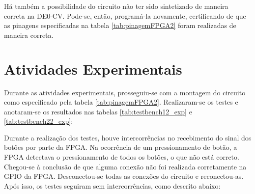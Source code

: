 \documentclass[amsmath,amssymb,floatfix]{report}
\begin{document}
Há também a possibilidade do circuito não ter sido sintetizado de maneira correta na DE0-CV. Pode-se, então, programá-la novamente, certificando de que as pinagens especificadas na tabela \ref{tab:pinagemFPGA2} foram realizadas de maneira correta.


\section{Atividades Experimentais}
\label{sec:exp2}

Durante as atividades experimentais, prosseguiu-se com a montagem do circuito como especificado pela tabela \ref{tab:pinagemFPGA2}. Realizaram-se os testes e anotaram-se os resultados nas tabelas \ref{tab:testbench12_exp} e \ref{tab:testbench22_exp}:

Durante a realização dos testes, houve intercorrências no recebimento do sinal dos botões por parte da FPGA. Na ocorrência de um pressionamento de botão, a FPGA detectava o pressionamento de todos os botões, o que não está correto. Chegou-se à conclusão de que alguma conexão não foi realizada corretamente na GPIO da FPGA. Desconectou-se todas as conexões do circuito e reconectou-as. Após isso, os testes seguiram sem intercorrências, como descrito abaixo:
\end{document}
